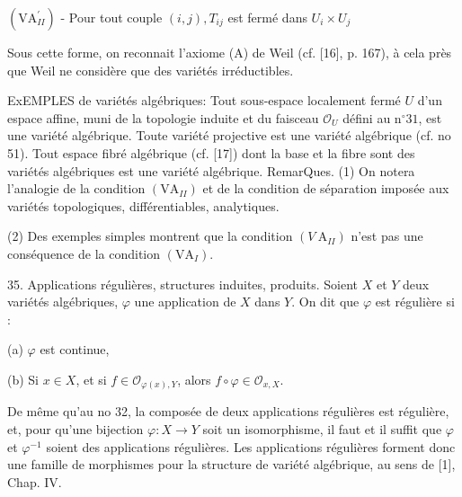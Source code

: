 $\left(\mathrm{VA}_{I I}^{\prime}\right)$ - Pour tout couple $(i, j), T_{i j}$ est fermé dans $U_{i} \times U_{j}$

Sous cette forme, on reconnait l'axiome (A) de Weil (cf. [16], p. 167), à cela près que Weil ne considère que des variétés irréductibles.

ExEMPLES de variétés algébriques: Tout sous-espace localement fermé $U$ d'un espace affine, muni de la topologie induite et du faisceau $\mathcal{O}_{U}$ défini au $\mathrm{n}^{\circ} 31$, est une variété algébrique. Toute variété projective est une variété algébrique (cf. no 51). Tout espace fibré algébrique (cf. [17]) dont la base et la fibre sont des variétés algébriques est une variété algébrique. RemarQues. (1) On notera l'analogie de la condition $\left(\mathrm{VA}_{I I}\right)$ et de la condition de séparation imposée aux variétés topologiques, différentiables, analytiques.

(2) Des exemples simples montrent que la condition $\left(V \mathrm{~A}_{I I}\right)$ n'est pas une conséquence de la condition $\left(\mathrm{VA}_{I}\right)$.

35. Applications régulières, structures induites, produits. Soient $X$ et $Y$ deux variétés algébriques, $\varphi$ une application de $X$ dans $Y$. On dit que $\varphi$ est régulière si :

(a) $\varphi$ est continue,

(b) Si $x \in X$, et si $f \in \mathcal{O}_{\varphi(x), Y}$, alors $f \circ \varphi \in \mathcal{O}_{x, X}$.

De même qu'au no 32, la composée de deux applications régulières est régulière, et, pour qu'une bijection $\varphi: X \rightarrow Y$ soit un isomorphisme, il faut et il suffit que $\varphi$ et $\varphi^{-1}$ soient des applications régulières. Les applications régulières forment donc une famille de morphismes pour la structure de variété algébrique, au sens de [1], Chap. IV.

